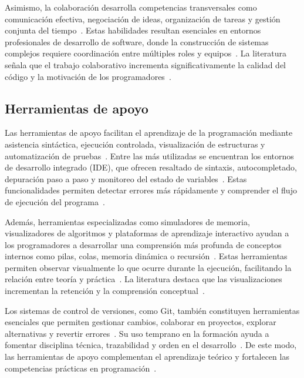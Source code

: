 \documentclass[12pt,twoside]{book}
\begin{document}
					Asimismo, la colaboración desarrolla competencias transversales como comunicación efectiva, negociación de ideas, organización de tareas y gestión conjunta del tiempo~\cite{Sommerville2015Software}. Estas habilidades resultan esenciales en entornos profesionales de desarrollo de software, donde la construcción de sistemas complejos requiere coordinación entre múltiples roles y equipos~\cite{Pressman2019Software}. La literatura señala que el trabajo colaborativo incrementa significativamente la calidad del código y la motivación de los programadores~\cite{Gaddis2022Starting}.
					
					
				\subsection{Herramientas de apoyo}
					Las herramientas de apoyo facilitan el aprendizaje de la programación mediante asistencia sintáctica, ejecución controlada, visualización de estructuras y automatización de pruebas~\cite{Gaddis2022Starting}. Entre las más utilizadas se encuentran los entornos de desarrollo integrado (IDE), que ofrecen resaltado de sintaxis, autocompletado, depuración paso a paso y monitoreo del estado de variables~\cite{Pressman2019Software}. Estas funcionalidades permiten detectar errores más rápidamente y comprender el flujo de ejecución del programa~\cite{Sommerville2015Software}.
					
					Además, herramientas especializadas como simuladores de memoria, visualizadores de algoritmos y plataformas de aprendizaje interactivo ayudan a los programadores a desarrollar una comprensión más profunda de conceptos internos como pilas, colas, memoria dinámica o recursión~\cite{Stallings2021Computer}. Estas herramientas permiten observar visualmente lo que ocurre durante la ejecución, facilitando la relación entre teoría y práctica~\cite{Gaddis2022Starting}. La literatura destaca que las visualizaciones incrementan la retención y la comprensión conceptual~\cite{Sommerville2015Software}.
					
					Los sistemas de control de versiones, como Git, también constituyen herramientas esenciales que permiten gestionar cambios, colaborar en proyectos, explorar alternativas y revertir errores~\cite{Pressman2019Software}. Su uso temprano en la formación ayuda a fomentar disciplina técnica, trazabilidad y orden en el desarrollo~\cite{Sommerville2015Software}. De este modo, las herramientas de apoyo complementan el aprendizaje teórico y fortalecen las competencias prácticas en programación~\cite{Stallings2021Computer}.
			
\end{document}
